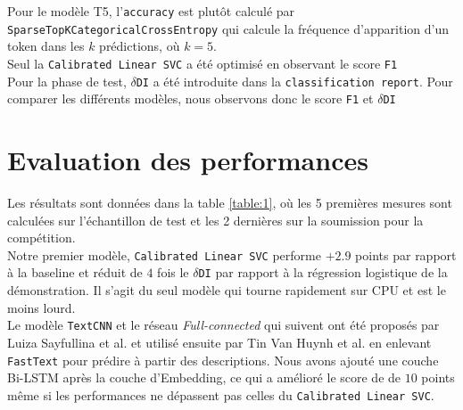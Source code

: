 Pour le modèle T5, l'\texttt{accuracy} est plutôt calculé par \texttt{SparseTopKCategoricalCrossEntropy} qui calcule la fréquence d'apparition d'un token dans les $k$ prédictions, où $k = 5$.\\
Seul la \texttt{Calibrated Linear SVC} a été optimisé en observant le score \texttt{F1}
\hfill\\

Pour la phase de test, $\delta$\texttt{DI} a été introduite dans la \texttt{classification report}. Pour comparer les différents modèles, nous observons donc le score \texttt{F1} et $\delta$\texttt{DI}

\section{Evaluation des performances}
Les résultats sont données dans la table \ref{table:1}, où les 5 premières mesures sont calculées sur l'échantillon de test et les 2 dernières sur la soumission pour la compétition.
\hfill\\

Notre premier modèle, \texttt{Calibrated Linear SVC} performe $+2.9$ points par rapport à la baseline et réduit de $4$ fois le $\delta$\texttt{DI} par rapport à la régression logistique de la démonstration. Il s'agit du seul modèle qui tourne rapidement sur CPU et est le moins lourd.
\hfill\\

Le modèle \texttt{TextCNN} et le réseau \textit{Full-connected} qui suivent ont été proposés par Luiza Sayfullina et al. et utilisé ensuite par Tin Van Huynh et al. en enlevant \texttt{FastText} pour prédire à partir des descriptions. Nous avons ajouté une couche Bi-LSTM après la couche d'Embedding, ce qui a amélioré le score de de $10$ points même si les performances ne dépassent pas celles du \texttt{Calibrated Linear SVC}.

\hfill\\


